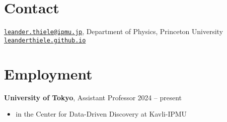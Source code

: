 \documentclass[margin]{res}
\begin{document}
 

\vspace*{0.8cm}


\begin{resume} 


\vspace*{-0.5cm}
\section{Contact}
\href{mailto:leander.thiele@ipmu.jp}{\texttt{leander.thiele@ipmu.jp}},
Department of Physics, Princeton University\\
\href{https://leanderthiele.github.io}{\texttt{leanderthiele.github.io}}



\section{Employment}
  {\bf University of Tokyo}, Assistant Professor \hfill 2024 -- present
  \begin{itemize}
    \item in the Center for Data-Driven Discovery at Kavli-IPMU
  \end{itemize}


\end{resume}
\end{document}
